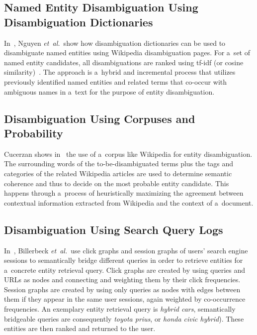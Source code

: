 \subsection{Named Entity Disambiguation Using Disambiguation Dictionaries}

In~\cite{nguyen2008namedentity},
Nguyen \emph{et~al.}\ show how disambiguation dictionaries
can be used to disambiguate named entities
using Wikipedia disambiguation pages.
For a~set of named entity candidates, all disambiguations are ranked
using tf-idf (or cosine similarity)~\cite{manning2008ir}.
The approach is a~hybrid and incremental process
that utilizes previously identified named entities
and related terms that  co-occur with ambiguous names
in a~text for the purpose of entity disambiguation.

\subsection{Disambiguation Using Corpuses and Probability}

Cucerzan shows in~\cite{cucerzan2007largescale}
the use of a~corpus like Wikipedia for entity disambiguation.
The surrounding words of the to-be-disambiguated terms
plus the tags and categories of the related Wikipedia articles
are used to determine semantic coherence and thus
to decide on the most probable entity candidate.
This happens through a~process of heuristically maximizing
the agreement between contextual information
extracted from Wikipedia and the context of a~document.

\subsection{Disambiguation Using Search Query Logs}

In~\cite{billerbeck2010rankingentities}, Billerbeck \emph{et~al.}\ use
click graphs and session graphs
of users' search engine sessions
to semantically bridge different queries in order to
retrieve entities for a~concrete entity retrieval query.
Click graphs are created by using queries and URLs as nodes
and connecting and weighting them by their click frequencies.
Session graphs are created by using only queries as nodes
with edges between them if they appear in the same user sessions,
again weighted by co-occurrence frequencies.
An exemplary entity retrieval query is \emph{hybrid cars},
semantically bridgeable queries are consequently \emph{toyota prius},
or \emph{honda civic hybrid}).
These entities are then ranked and returned to the user.

